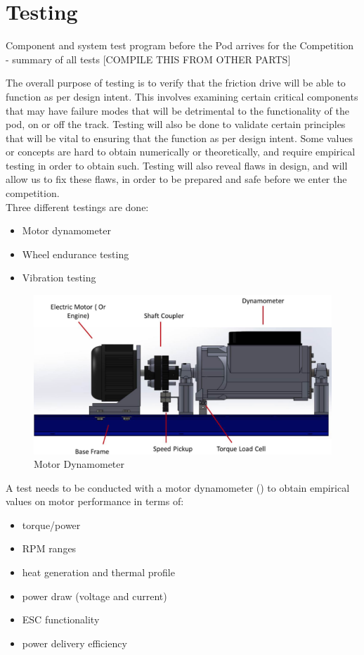 \documentclass[main.tex]{subfiles}
\begin{document}
    \section{Testing}
    Component and system test program before the Pod arrives for the Competition - summary of all tests [COMPILE THIS FROM OTHER PARTS]
    
    The overall purpose of testing is to verify that the friction drive will be able to function as per design intent. This involves examining certain critical components that may have failure modes that will be detrimental to the functionality of the pod, on or off the track. Testing will also be done to validate certain principles that will be vital to ensuring that the function as per design intent. Some values or concepts are hard to obtain numerically or theoretically, and require empirical testing in order to obtain such. Testing will also reveal flaws in design, and will allow us to fix these flaws, in order to be prepared and safe before we enter the competition.\\
    
    Three different testings are done:
    \begin{itemize}
        \item Motor dynamometer
        \item Wheel endurance testing
        \item Vibration testing
    \end{itemize}

   \begin{figure}
		\centering
       \includegraphics[width=0.5\linewidth]{images/motordyna}
       \caption{Motor Dynamometer}
       \label{fig:motordyna}
   \end{figure}
    A test needs to be conducted with a motor dynamometer () to obtain empirical values on motor performance in terms of:
    
    \begin{itemize}
        \item torque/power
        \item RPM ranges
        \item heat generation and thermal profile
        \item power draw (voltage and current)
        \item ESC functionality
        \item power delivery efficiency
    \end{itemize}
    
\end{document}
